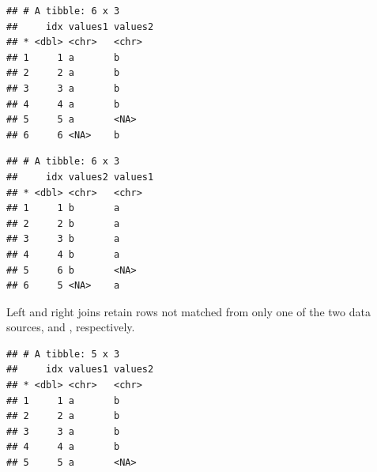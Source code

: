 \documentclass[krantz2]{krantz}\usepackage{knitr}
\begin{document}
\begin{knitrout}\footnotesize
{}\color{fgcolor}\begin{kframe}
\begin{alltt}
\hlstd{(}   
\end{alltt}


{\ttfamily\noindent\itshape{}}\begin{verbatim}
## # A tibble: 6 x 3
##     idx values1 values2
## * <dbl> <chr>   <chr>
## 1     1 a       b
## 2     2 a       b
## 3     3 a       b
## 4     4 a       b
## 5     5 a       <NA>
## 6     6 <NA>    b
\end{verbatim}
\end{kframe}
\end{knitrout}

\begin{knitrout}\footnotesize
{}\color{fgcolor}\begin{kframe}
\begin{alltt}
\hlstd{(}   
\end{alltt}


{\ttfamily\noindent\itshape{}}\begin{verbatim}
## # A tibble: 6 x 3
##     idx values2 values1
## * <dbl> <chr>   <chr>
## 1     1 b       a
## 2     2 b       a
## 3     3 b       a
## 4     4 b       a
## 5     6 b       <NA>
## 6     5 <NA>    a
\end{verbatim}
\end{kframe}
\end{knitrout}

Left and right joins retain rows not matched from only one of the two data sources,  and , respectively.

\begin{knitrout}\footnotesize
{}\color{fgcolor}\begin{kframe}
\begin{alltt}
\hlstd{(}   
\end{alltt}


{\ttfamily\noindent\itshape{}}\begin{verbatim}
## # A tibble: 5 x 3
##     idx values1 values2
## * <dbl> <chr>   <chr>
## 1     1 a       b
## 2     2 a       b
## 3     3 a       b
## 4     4 a       b
## 5     5 a       <NA>
\end{verbatim}
\end{kframe}
\end{knitrout}
\end{document}

